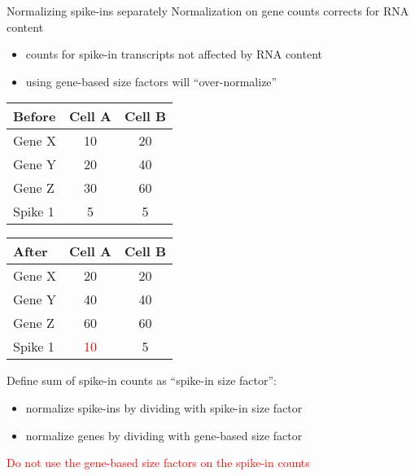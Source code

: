 \documentclass{beamer}
\begin{document}

\begin{frame}{Normalizing spike-ins separately}
Normalization on gene counts corrects for RNA content
\begin{itemize}
    \item counts for spike-in transcripts not affected by RNA content
    \item using gene-based size factors will ``over-normalize''
\end{itemize}
\begin{center}
    \begin{minipage}{0.49\textwidth}
        \begin{tabular}{|l|c c|}
            \hline
            \textbf{Before}
                   & Cell A & Cell B \\
            \hline
            Gene X & 10 & 20 \\
            Gene Y & 20 & 40 \\
            Gene Z & 30 & 60 \\
            Spike 1 & 5 & 5  \\
            \hline
        \end{tabular}
        \end{minipage}
    \begin{minipage}{0.49\textwidth}
        \begin{tabular}{|l|c c|}
            \hline
            \textbf{After}
                   & Cell A & Cell B \\
            \hline
            Gene X & 20 & 20 \\
            Gene Y & 40 & 40 \\
            Gene Z & 60 & 60 \\
            Spike 1 & \textcolor{red}{10} & 5  \\
            \hline
        \end{tabular}
        \end{minipage}
    \end{center}
Define sum of spike-in counts as ``spike-in size factor'':
\begin{itemize}
    \item normalize spike-ins by dividing with spike-in size factor
    \item normalize genes by dividing with gene-based size factor
\end{itemize}
\pause
\textcolor{red}{Do not use the gene-based size factors on the spike-in counts}
\end{frame}
\end{document}
